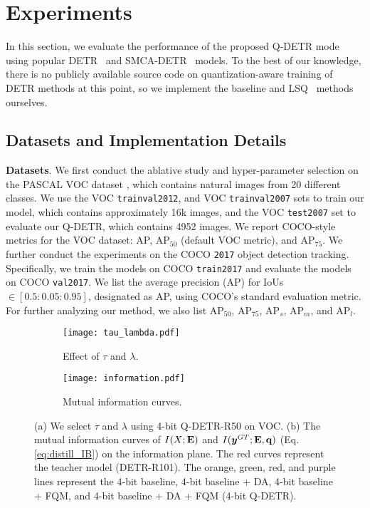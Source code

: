 \documentclass[10pt,twocolumn,letterpaper]{article}
\begin{document}
\section{Experiments}
In this section, we evaluate the performance of the proposed Q-DETR mode using popular DETR~\cite{carion2020end} and SMCA-DETR~\cite{gao2021fast} models. To the best of our knowledge, there is no publicly available source code  on quantization-aware training of DETR methods at this point, so we implement the baseline and LSQ~\cite{esser2019learned} methods ourselves.

\subsection{Datasets and Implementation Details}
\label{sec:setup}
\textbf{Datasets}.
We first conduct the ablative study and hyper-parameter selection on the PASCAL VOC dataset \cite{voc2007}, which contains natural images from 20 different classes. We use the VOC {\tt trainval2012}, and VOC {\tt trainval2007} sets to train our model, which contains approximately 16k images, and the VOC {\tt test2007} set to evaluate our Q-DETR, which contains 4952 images. We report COCO-style metrics for the VOC dataset: AP, AP$_{50}$ (default VOC metric), and AP$_{75}$.
We further conduct the experiments on the COCO {\tt 2017} \cite{coco2014} object detection tracking. Specifically, we train the models on COCO {\tt train2017} and evaluate the models on COCO {\tt val2017}.
We list the average precision (AP) for IoUs$\in [0.5:0.05:0.95]$, designated as AP, using COCO's standard evaluation metric. For further analyzing our method, we also list AP$_{50}$, AP$_{75}$, AP$_s$, AP$_m$, and AP$_l$.

\begin{figure}
        \centering
        \begin{subfigure}{0.495\linewidth}
    	\centering
    	\texttt{[image: tau\_lambda.pdf]}
    	\caption{Effect of $\tau$ and $\lambda$.}
    	\label{motivation:teacher1}
        \end{subfigure}
        \begin{subfigure}{0.495\linewidth}
    	\centering
    	\texttt{[image: information.pdf]}
 		\caption{Mutual information curves.}
    	\label{motivation:teacher_false1}
        \end{subfigure}
        \caption{(a) We select $\tau$ and $\lambda$ using 4-bit Q-DETR-R50 on VOC. (b) The mutual information curves of $I(X; {\bf E})$ and $I(\bm{y}^{GT}; {\bf E}, {\bf q})$ (Eq.\;\ref{eq:distill_IB}) on the information plane. The red curves represent the teacher model (DETR-R101). The orange, green, red, and purple lines represent the 4-bit baseline, 4-bit baseline + DA, 4-bit baseline + FQM, and 4-bit baseline + DA + FQM (4-bit Q-DETR).}
        \label{hyper-parameter}
    \end{figure}
\end{document}
